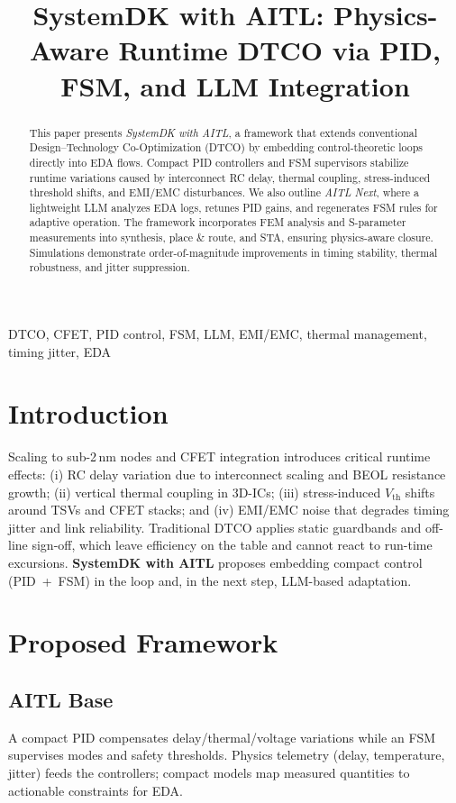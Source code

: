 \documentclass[conference]{IEEEtran}
\title{SystemDK with AITL: Physics-Aware Runtime DTCO via PID, FSM, and LLM Integration}
\author{%
  \IEEEauthorblockN{Shinichi Samizo}%
  \IEEEauthorblockA{Independent Semiconductor Researcher\\
  Email: \href{mailto:shin3t72@gmail.com}{shin3t72@gmail.com}}%
}
\begin{document}
\maketitle

\begin{abstract}
This paper presents \emph{SystemDK with AITL}, a framework that extends conventional Design--Technology Co-Optimization (DTCO) by embedding control-theoretic loops directly into EDA flows. Compact PID controllers and FSM supervisors stabilize runtime variations caused by interconnect RC delay, thermal coupling, stress-induced threshold shifts, and EMI/EMC disturbances. We also outline \emph{AITL Next}, where a lightweight LLM analyzes EDA logs, retunes PID gains, and regenerates FSM rules for adaptive operation. The framework incorporates FEM analysis and S-parameter measurements into synthesis, place \& route, and STA, ensuring physics-aware closure. Simulations demonstrate order-of-magnitude improvements in timing stability, thermal robustness, and jitter suppression.
\end{abstract}

\begin{IEEEkeywords}
DTCO, CFET, PID control, FSM, LLM, EMI/EMC, thermal management, timing jitter, EDA
\end{IEEEkeywords}

\section{Introduction}
Scaling to sub-2\,nm nodes and CFET integration introduces critical runtime effects: (i) RC delay variation due to interconnect scaling and BEOL resistance growth; (ii) vertical thermal coupling in 3D-ICs; (iii) stress-induced $V_{\mathrm{th}}$ shifts around TSVs and CFET stacks; and (iv) EMI/EMC noise that degrades timing jitter and link reliability. Traditional DTCO applies static guardbands and off-line sign-off, which leave efficiency on the table and cannot react to run-time excursions. \textbf{SystemDK with AITL} proposes embedding compact control (PID~+~FSM) in the loop and, in the next step, LLM-based adaptation.

\section{Proposed Framework}
\subsection{AITL Base}
A compact PID compensates delay/thermal/voltage variations while an FSM supervises modes and safety thresholds. Physics telemetry (delay, temperature, jitter) feeds the controllers; compact models map measured quantities to actionable constraints for EDA.
\end{document}

